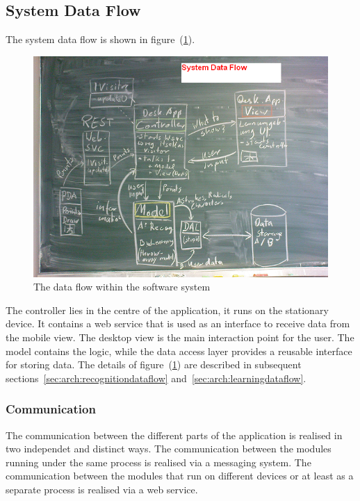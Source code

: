 \subsection{System Data Flow}
\label{sec:arch:systemdataflow}
The system data flow is shown in figure~(\ref{fig:systemdataflow}).
\begin{figure}[htbp]
\begin{center}
\includegraphics[scale=0.5]{images/TechnicalDesign/SystemDataFlow.png}
\caption{The data flow within the software system}
\label{fig:systemdataflow}
\end{center}
\end{figure}
The controller lies in the centre of the application, it runs on the stationary
device. It contains a web service that is used as an interface to receive data 
from the mobile view. The desktop view is the main interaction point for the 
user. The model contains the logic, while the data access layer provides a 
reusable interface for storing data. The details of 
figure~(\ref{fig:systemdataflow}) are described in subsequent 
sections~\ref{sec:arch:recognitiondataflow} and~\ref{sec:arch:learningdataflow}.

\subsubsection{Communication}
\label{sec:communication}

The communication between the different parts of the application is realised 
in two independet and distinct ways. The communication between the 
modules running under the same process is realised via a messaging system. 
The communication between the modules that run on different devices
or at least as a separate process is realised via a web service.

